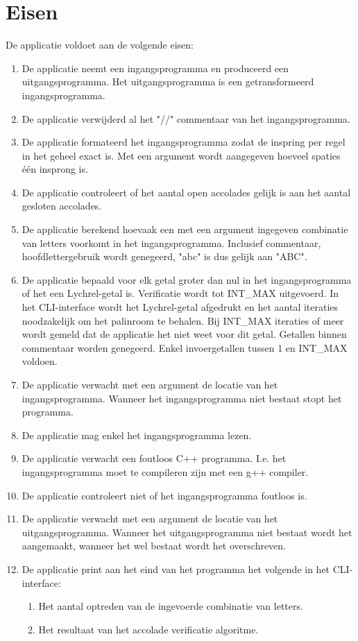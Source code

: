 \documentclass[10pt]{article}
\begin{document}
\section{Eisen} \label{sec:eisen}
De applicatie voldoet aan de volgende eisen:
\begin{enumerate}
      \item De applicatie neemt een ingangsprogramma en produceerd een uitgangsprogramma. Het uitgangsprogramma is een
            getransformeerd ingangsprogramma.
      \item De applicatie verwijderd al het "//" commentaar van het ingangsprogramma.
      \item De applicatie formateerd het ingangsprogramma zodat de inspring per regel in het geheel exact is. Met een
            argument wordt aangegeven hoeveel spaties \'e\'en insprong is.
      \item De applicatie controleert of het aantal open accolades gelijk is aan het aantal gesloten accolades.
      \item De applicatie berekend hoevaak een met een argument ingegeven combinatie van letters voorkomt in het
            ingangsprogramma. Inclusief commentaar, hoofdlettergebruik wordt genegeerd, "abc" is dus gelijk aan
            "ABC".
      \item De applicatie bepaald voor elk getal groter dan nul in het ingangsprogramma of het een Lychrel-getal is.
            Verificatie
            wordt tot INT\_MAX uitgevoerd. In het CLI-interface wordt het Lychrel-getal afgedrukt en het aantal
            iteraties
            noodzakelijk om het palinroom te behalen. Bij INT\_MAX iteraties of meer wordt gemeld dat de applicatie het
            niet weet voor dit
            getal. Getallen binnen commentaar worden genegeerd. Enkel invoergetallen tussen 1 en INT\_MAX voldoen.
      \item De applicatie verwacht met een argument de locatie van het ingangsprogramma. Wanneer het ingangsprogramma
            niet bestaat stopt het programma.
      \item De applicatie mag enkel het ingangsprogramma lezen.
      \item De applicatie verwacht een foutloos C++ programma. I.e. het ingangsprogramma moet te compileren zijn met
            een
            g++ compiler.
      \item De applicatie controleert niet of het ingangsprogramma foutloos is.
      \item De applicatie verwacht met een argument de locatie van het uitgangsprogramma. Wanneer het uitgangsprogramma
            niet bestaat wordt het aangemaakt, wanneer het wel bestaat wordt het overschreven.
      \item De applicatie print aan het eind van het programma het volgende in het CLI-interface:
            \begin{enumerate}
                  \item Het aantal optreden van de ingevoerde combinatie van letters.
                  \item Het resultaat van het accolade verificatie algoritme.
            \end{enumerate}
\end{enumerate}
\end{document}
